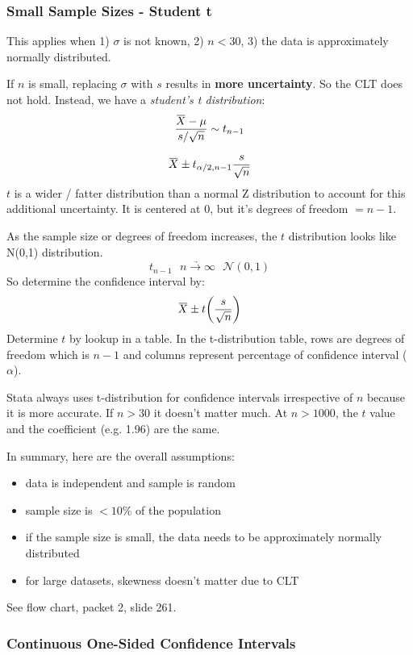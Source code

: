 \documentclass[11pt, oneside]{article}   	%
\newcommand{\overbar}[1]{\mkern 1.5mu\overline{\mkern-1.5mu#1\mkern-1.5mu}\mkern 1.5mu}
\begin{document}
\subsubsection{Small Sample Sizes - Student t}

This applies when 1) $\sigma$ is not known, 2) $n < 30$, 3) the data is approximately normally distributed.

If $n$ is small, replacing $\sigma$ with $s$ results in \textbf{more uncertainty}. So the CLT does not hold. Instead, we have a \textit{student's t distribution}:
\[
\frac{\overbar{X} - \mu} {s / \sqrt{n}} \sim t_{n-1}
\]

\[
\overbar{X} \pm t_{\alpha / 2, n-1} \frac{s} {\sqrt{n}}
\]
$t$ is a wider / fatter distribution than a normal Z distribution to account for this additional uncertainty. It is centered at 0, but it's degrees of freedom $= n-1$. 

As the sample size or degrees of freedom increases, the $t$ distribution looks like N(0,1) distribution.
\[
t_{n-1} \ \ \ \underrightarrow{n \rightarrow \infty} \ \ \ \mathcal{N}(0,1)
\]
So determine the confidence interval by:
\[
\overbar{X} \pm t \bigg(\frac{s}{\sqrt{n}}\bigg)
\]
Determine $t$ by lookup in a table. In the t-distribution table, rows are degrees of freedom which is $n-1$ and columns represent percentage of confidence interval ($\alpha$). 

Stata always uses t-distribution for confidence intervals irrespective of $n$ because it is more accurate. If $n > 30$ it doesn't matter much. At $n > 1000$, the $t$ value and the coefficient (e.g. 1.96) are the same.

In summary, here are the overall assumptions:
\begin{itemize}
\item{data is independent and sample is random}
\item{sample size is $< 10\%$ of the population}
\item{if the sample size is small, the data needs to be approximately normally distributed}
\item{for large datasets, skewness doesn't matter due to CLT}
\end{itemize}

See flow chart, packet 2, slide 261.

\subsubsection{Continuous One-Sided Confidence Intervals}
\end{document}
